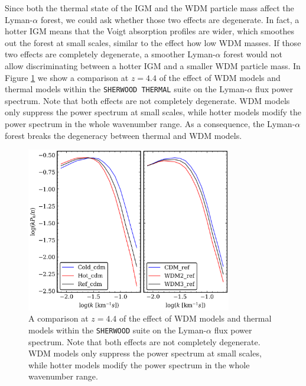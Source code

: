 Since both the thermal state of the IGM and the WDM particle mass affect the Lyman-$\alpha$ forest, we could ask whether those two effects are degenerate. In fact, a hotter IGM means that the Voigt absorption profiles are wider, which smoothes out the forest at small scales, similar to the effect how low WDM masses. If those two effects are completely degenerate, a smoother Lyman-$\alpha$ forest would not allow discriminating between a hotter IGM and a smaller WDM particle mass. In Figure \ref{fig: PS thermal vs WDM} we show a comparison at $z=4.4$ of the effect of WDM models and thermal models within the \texttt{SHERWOOD THERMAL} suite on the Lyman-$\alpha$ flux power spectrum. Note that both effects are not completely degenerate. WDM models only suppress the power spectrum at small scales, while hotter models modify the power spectrum in the whole wavenumber range. As a consequence, the Lyman-$\alpha$ forest breaks the degeneracy between thermal and WDM models.

\begin{figure}[ht]
        \centering
            \includegraphics[width=0.8\textwidth]{img/ML/PS_thermal_vs_wdm.png}
            \caption{A comparison at $z=4.4$ of the effect of WDM models and thermal models within the \texttt{SHERWOOD} suite on the Lyman-$\alpha$ flux power spectrum. Note that both effects are not completely degenerate. WDM models only suppress the power spectrum at small scales, while hotter models modify the power spectrum in the whole wavenumber range.}
            \label{fig: PS thermal vs WDM}
\end{figure}   




